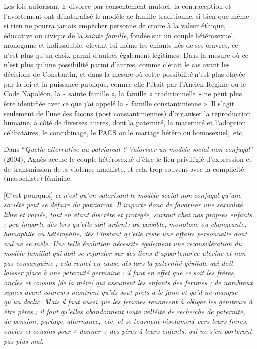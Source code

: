 Les lois autorisant le divorce par consentement mutuel, la contraception et l'avortement ont dénaturalisé le modèle de famille traditionnel si bien que même si rien ne pourra jamais empêcher personne de croire à la valeur éthique, éducative ou civique de la {\emph{sainte famille}}, fondée sur un couple hétérosexuel, monogame et indissoluble, élevant lui-même les enfants nés de ses œuvres, ce n'est plus qu'un choix parmi d'autres également légitimes. Dans la mesure où ce n'est plus qu'une possibilité parmi d'autres, comme c'était le cas avant les décisions de Constantin, et dans la mesure où cette possibilité n'est plus étayée par la loi et la puissance publique, comme elle l'était par l'Ancien Régime ou le Code Napoléon, la « sainte famille », la famille « traditionnelle » ne peut plus être identifiée avec ce que j'ai appelé la « famille constantinienne ». Il s'agit seulement de l'une des façons (post constantiniennes) d'organiser la reproduction humaine, à côté de diverses autres, dont la paternité, la maternité et l'adoption célibataires, le concubinage, le PACS ou le mariage hétéro ou homosexuel,~etc.



Dans \enquote{\emph{Quelle alternative au patriarcat ? Valoriser un modèle social non conjugal}} (2004), Agnès  accuse le couple hétérosexué d'être le lieu privilégié d'expression et de transmission de la violence machiste, et cela trop souvent avec la complicité (masochiste) féminine. %

\begin{displayquote}
{[C'est pourquoi] \emph{ce n'est qu'en valorisant le modèle social non conjugal qu'une société peut se défaire du patriarcat. Il importe donc de favoriser une sexualité libre et variée, tout en étant discrète et protégée, surtout chez nos propres enfants ; peu importe dès lors qu'elle soit ardente ou paisible, monotone ou changeante, homophile ou hétérophile, dès l'instant qu'elle reste une affaire personnelle dont nul ne se mêle. Une telle évolution nécessite également une reconsidération du modèle familial qui doit se refonder sur des liens d'appartenance utérine et non pas consanguine ; cela remet en cause dès lors la paternité génitale qui doit laisser place à une paternité germaine : il faut en effet que ce soit les frères, oncles et cousins \emph{[de la mère]} qui assument les enfants des femmes ; de nombreux signes avant-coureurs montrent qu'ils sont prêts à le faire et qu'il ne manque qu'un déclic. Mais il faut aussi que les femmes renoncent à obliger les géniteurs à être pères ; il faut qu'elles abandonnent toute velléité de recherche de paternité, de pension, partage, alternance,~etc. et se tournent résolument vers leurs frères, oncles et cousins pour « donner » des pères à leurs enfants, qui ne s'en porteront pas plus mal.}}
\end{displayquote}

